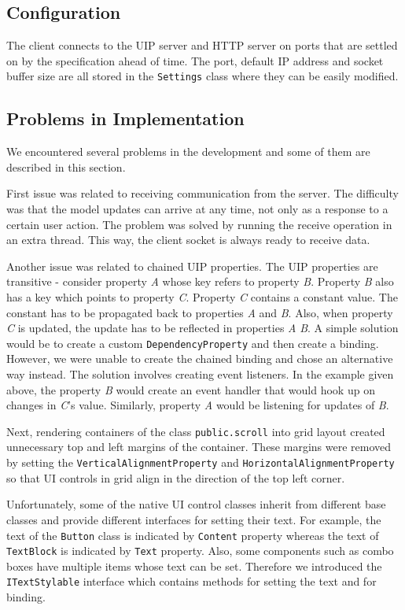 
\subsection{Configuration}
The client connects to the UIP server and HTTP server on ports that are settled on by the specification ahead of time. The port, default IP address and socket buffer size are all stored in the \texttt{Settings} class where they can be easily modified.

\subsection{Problems in Implementation}
We encountered several problems in the development and some of them are described in this section.

First issue was related to receiving communication from the server. The difficulty was that the model updates can arrive at any time, not only as a response to a certain user action. The problem was solved by running the receive operation in an extra thread. This way, the client socket is always ready to receive data.

Another issue was related to chained UIP properties. The UIP properties are transitive - consider property \emph{A} whose key refers to property \emph{B}. Property \emph{B} also has a key which points to property \emph{C}. Property \emph{C} contains a constant value. The constant has to be propagated back to properties \emph{A} and \emph{B}. Also, when property \emph{C} is updated, the update has to be reflected in properties \emph{A} \emph{B}.
A simple solution would be to create a custom \texttt{DependencyProperty} and then create a binding. However, we were unable to create the chained binding and chose an alternative way instead. The solution involves creating event listeners. In the example given above, the property \emph{B} would create an event handler that would hook up on changes in \emph{C}'s value. Similarly, property \emph{A} would be listening for updates of \emph{B}.

Next, rendering containers of the class \texttt{public.scroll} into grid layout created unnecessary top and left margins of the container. These margins were removed by setting the \texttt{VerticalAlignmentProperty} and  \texttt{HorizontalAlignmentProperty} so that UI controls in grid align in the direction of the top left corner.

Unfortunately, some of the native UI control classes inherit from different base classes and provide different interfaces for setting their text. For example, the text of the \texttt{Button} class is indicated by \texttt{Content} property whereas the text of \texttt{TextBlock} is indicated by \texttt{Text} property. Also, some components such as combo boxes have multiple items whose text can be set. Therefore we introduced the \texttt{ITextStylable} interface which contains methods for setting the text and for binding.